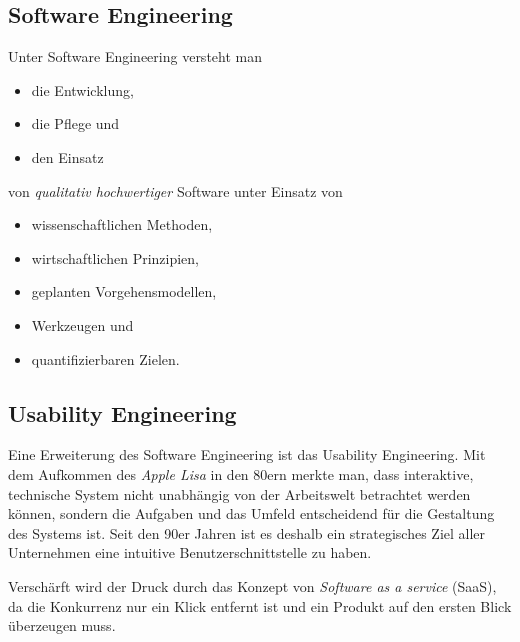 \documentclass[../main.tex]{subfiles}
\begin{document}
        \subsection{Software Engineering}
            Unter Software Engineering versteht man
            
            \begin{itemize}
                \item die Entwicklung,
                \item die Pflege und
                \item den Einsatz
            \end{itemize}
            von \emph{qualitativ hochwertiger} Software unter Einsatz von
            
            \begin{itemize}
                \item wissenschaftlichen Methoden,
                \item wirtschaftlichen Prinzipien,
                \item geplanten Vorgehensmodellen,
                \item Werkzeugen und
                \item quantifizierbaren Zielen.
            \end{itemize}
            
        \subsection{Usability Engineering}
            Eine Erweiterung des Software Engineering ist das Usability Engineering. Mit dem Aufkommen des \emph{Apple Lisa} in den 80ern merkte man, dass interaktive, technische System nicht unabhängig von der Arbeitswelt betrachtet werden können, sondern die Aufgaben und das Umfeld entscheidend für die Gestaltung des Systems ist. Seit den 90er Jahren ist es deshalb ein strategisches Ziel aller Unternehmen eine intuitive Benutzerschnittstelle zu haben.
                
            Verschärft wird der Druck durch das Konzept von \emph{Software as a service} (SaaS), da die Konkurrenz nur ein Klick entfernt ist und ein Produkt auf den ersten Blick überzeugen muss.
\end{document}
